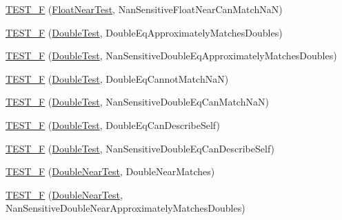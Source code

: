 \begin{DoxyCompactItemize}
\item 
\mbox{\hyperlink{namespacetesting_1_1gmock__matchers__test_ae7521865828fba53b45cc2819bec1273}{T\+E\+S\+T\+\_\+F}} (\mbox{\hyperlink{namespacetesting_1_1gmock__matchers__test_a426b51f464dcb48033946e1bf3cc8795}{Float\+Near\+Test}}, Nan\+Sensitive\+Float\+Near\+Can\+Match\+NaN)
\item 
\mbox{\hyperlink{namespacetesting_1_1gmock__matchers__test_a1b33dc485faca8c69184f3feb0476290}{T\+E\+S\+T\+\_\+F}} (\mbox{\hyperlink{namespacetesting_1_1gmock__matchers__test_a944cdd366ed240f29ae8e3ebc753ad5c}{Double\+Test}}, Double\+Eq\+Approximately\+Matches\+Doubles)
\item 
\mbox{\hyperlink{namespacetesting_1_1gmock__matchers__test_ab100ee4a4b0340e31212fb43c9e28255}{T\+E\+S\+T\+\_\+F}} (\mbox{\hyperlink{namespacetesting_1_1gmock__matchers__test_a944cdd366ed240f29ae8e3ebc753ad5c}{Double\+Test}}, Nan\+Sensitive\+Double\+Eq\+Approximately\+Matches\+Doubles)
\item 
\mbox{\hyperlink{namespacetesting_1_1gmock__matchers__test_a4c34f3f339de72d3f4f96a08a5125b59}{T\+E\+S\+T\+\_\+F}} (\mbox{\hyperlink{namespacetesting_1_1gmock__matchers__test_a944cdd366ed240f29ae8e3ebc753ad5c}{Double\+Test}}, Double\+Eq\+Cannot\+Match\+NaN)
\item 
\mbox{\hyperlink{namespacetesting_1_1gmock__matchers__test_ab42c199ae0008ce7550f584742caec28}{T\+E\+S\+T\+\_\+F}} (\mbox{\hyperlink{namespacetesting_1_1gmock__matchers__test_a944cdd366ed240f29ae8e3ebc753ad5c}{Double\+Test}}, Nan\+Sensitive\+Double\+Eq\+Can\+Match\+NaN)
\item 
\mbox{\hyperlink{namespacetesting_1_1gmock__matchers__test_a5975fb5a50e5364fe21422093680a559}{T\+E\+S\+T\+\_\+F}} (\mbox{\hyperlink{namespacetesting_1_1gmock__matchers__test_a944cdd366ed240f29ae8e3ebc753ad5c}{Double\+Test}}, Double\+Eq\+Can\+Describe\+Self)
\item 
\mbox{\hyperlink{namespacetesting_1_1gmock__matchers__test_a2d101d1823617f9b1346ee64cdce5216}{T\+E\+S\+T\+\_\+F}} (\mbox{\hyperlink{namespacetesting_1_1gmock__matchers__test_a944cdd366ed240f29ae8e3ebc753ad5c}{Double\+Test}}, Nan\+Sensitive\+Double\+Eq\+Can\+Describe\+Self)
\item 
\mbox{\hyperlink{namespacetesting_1_1gmock__matchers__test_ab2949593472038919b8f3e1b2da204bc}{T\+E\+S\+T\+\_\+F}} (\mbox{\hyperlink{namespacetesting_1_1gmock__matchers__test_aea537d0183ccc65b5c49a75d711993c8}{Double\+Near\+Test}}, Double\+Near\+Matches)
\item 
\mbox{\hyperlink{namespacetesting_1_1gmock__matchers__test_add8765ad2bb98f4b064ee77b4c21a612}{T\+E\+S\+T\+\_\+F}} (\mbox{\hyperlink{namespacetesting_1_1gmock__matchers__test_aea537d0183ccc65b5c49a75d711993c8}{Double\+Near\+Test}}, Nan\+Sensitive\+Double\+Near\+Approximately\+Matches\+Doubles)

\end{DoxyCompactItemize}
